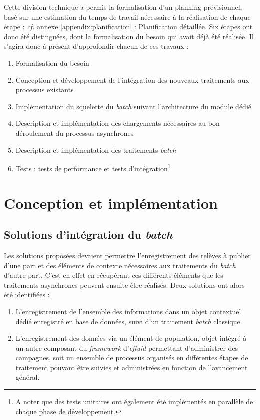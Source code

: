 \documentclass[a4paper, 12pt]{report}
\begin{document}
Cette division technique a permis la formalisation d'un planning prévisionnel, basé sur une estimation du temps de travail nécessaire à la réalisation de chaque étape : \textit{cf.} annexe \ref{appendix:planification} : Planification détaillée. Six étapes ont donc été distinguées, dont la formalisation du besoin qui avait déjà été réalisée. Il s'agira donc à présent d'approfondir chacun de ces travaux :\\

\begin{enumerate}
  \item Formalisation du besoin
  \item Conception et développement de l'intégration des nouveaux traitements aux processus existants
  \item Implémentation du squelette du \textit{batch} suivant l'architecture du module dédié
  \item Description et implémentation des chargements nécessaires au bon déroulement du processus asynchrones
  \item Description et implémentation des traitements \textit{batch}
  \item Tests : tests de performance et tests d'intégration\footnote{A noter que des tests unitaires ont également été implémentés en parallèle de chaque phase de développement.}
\end{enumerate}

\section{Conception et implémentation}

\subsection{Solutions d'intégration du \textit{batch}}

Les solutions proposées devaient permettre l’enregistrement des relèves à publier d'une part et des éléments de contexte nécessaires aux traitements du \textit{batch} d'autre part. C'est en effet en récupérant ces différents éléments que les traitements asynchrones peuvent ensuite être réalisés. Deux solutions ont alors été identifiées :\\

\begin{enumerate}
  \item L'enregistrement de l'ensemble des informations dans un objet contextuel dédié enregistré en base de données, suivi d'un traitement \textit{batch} classique.
  \item L'enregistrement des données via un élément de population, objet intégré à un autre composant du \textit{framework} d'\textit{efluid} permettant d'administrer des campagnes, soit un ensemble de processus organisés en différentes étapes de traitement pouvant être suivies et administrées en fonction de l'avancement général.
\end{enumerate}
\vspace{0.5cm}
\end{document}
